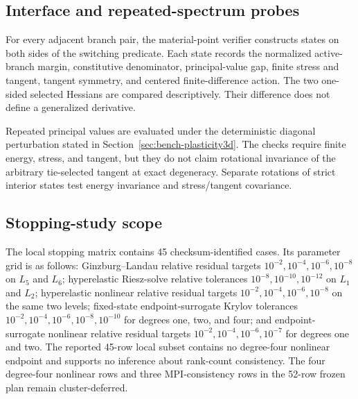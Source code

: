 \subsection{Interface and repeated-spectrum probes}
\label{subsec:interface-probes}

For every adjacent branch pair, the material-point verifier constructs states
on both sides of the switching predicate. Each state records the normalized
active-branch margin, constitutive denominator, principal-value gap, finite
stress and tangent, tangent symmetry, and centered finite-difference action.
The two one-sided selected Hessians are compared descriptively. Their difference
does not define a generalized derivative.

Repeated principal values are evaluated under the deterministic diagonal
perturbation stated in Section~\ref{sec:bench-plasticity3d}. The checks require
finite energy, stress, and tangent, but they do not claim rotational invariance
of the arbitrary tie-selected tangent at exact degeneracy. Separate rotations
of strict interior states test energy invariance and stress/tangent covariance.

\subsection{Stopping-study scope}
\label{subsec:stopping-study-scope}

The local stopping matrix contains 45 checksum-identified cases. Its parameter
grid is as follows: Ginzburg--Landau relative residual targets
$10^{-2},10^{-4},10^{-6},10^{-8}$ on $L_5$ and $L_6$; hyperelastic Riesz-solve
relative tolerances $10^{-8},10^{-10},10^{-12}$ on $L_1$ and $L_2$;
hyperelastic nonlinear relative residual targets
$10^{-2},10^{-4},10^{-6},10^{-8}$ on the same two levels; fixed-state
endpoint-surrogate Krylov tolerances $10^{-2},10^{-4},10^{-6},10^{-8},10^{-10}$
for degrees one, two, and four; and endpoint-surrogate nonlinear relative
residual targets $10^{-2},10^{-4},10^{-6},10^{-7}$ for degrees one and two.
The reported 45-row local subset contains no degree-four nonlinear endpoint
and supports no inference about rank-count consistency. The four
degree-four nonlinear rows and three MPI-consistency rows in the 52-row frozen
plan remain cluster-deferred.

